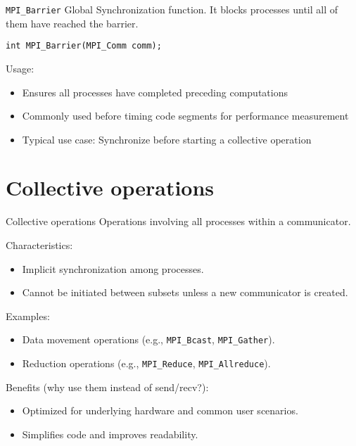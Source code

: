 \documentclass{beamer}
\begin{document}
\begin{frame}{\texttt{MPI\_Barrier}}
  Global Synchronization function. It blocks processes until all of them have reached the barrier.

  \texttt{int MPI\_Barrier(MPI\_Comm comm);}

  Usage:

  \begin{itemize}
    \item Ensures all processes have completed preceding computations
    \item Commonly used before timing code segments for performance measurement
    \item Typical use case: Synchronize before starting a collective operation
  \end{itemize}
\end{frame}

\section{Collective operations}

\begin{frame}{Collective operations}
  Operations involving all processes within a communicator.

  Characteristics:
  \begin{itemize}
    \item Implicit synchronization among processes.
    \item Cannot be initiated between subsets unless a new communicator is created.
  \end{itemize}

  Examples:
  \begin{itemize}
    \item Data movement operations (e.g., \texttt{MPI\_Bcast}, \texttt{MPI\_Gather}).
    \item Reduction operations (e.g., \texttt{MPI\_Reduce}, \texttt{MPI\_Allreduce}).
  \end{itemize}

  Benefits (why use them instead of send/recv?):
  \begin{itemize}
    \item Optimized for underlying hardware and common user scenarios.
    \item Simplifies code and improves readability.
  \end{itemize}
\end{frame}
\end{document}
